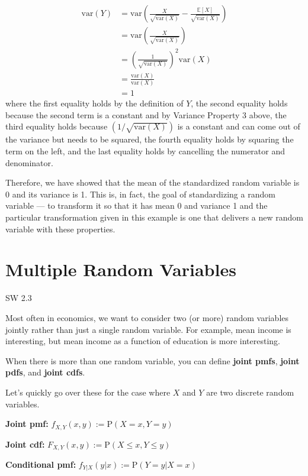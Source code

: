 \documentclass[
  letterpaper,
  DIV=11,
  numbers=noendperiod]{scrreprt}
\begin{document}
\[
  \begin{aligned}
  \mathrm{var}(Y) &= \mathrm{var}\left( \frac{X}{\sqrt{\mathrm{var}(X)}} - \frac{\mathbb{E}[X]}{\sqrt{\mathrm{var}(X)}} \right) \\
  &= \mathrm{var}\left( \frac{X}{\sqrt{\mathrm{var}(X)}}\right) \\
  &= \left( \frac{1}{\sqrt{\mathrm{var}(X)}} \right)^2 \mathrm{var}(X) \\
  &= \frac{\mathrm{var}(X)}{\mathrm{var}(X)} \\
  &= 1
  \end{aligned}
\] where the first equality holds by the definition of \(Y\), the second
equality holds because the second term is a constant and by Variance
Property 3 above, the third equality holds because
\((1/\sqrt{\mathrm{var}(X)})\) is a constant and can come out of the
variance but needs to be squared, the fourth equality holds by squaring
the term on the left, and the last equality holds by cancelling the
numerator and denominator.

Therefore, we have showed that the mean of the standardized random
variable is 0 and its variance is 1. This is, in fact, the goal of
standardizing a random variable --- to transform it so that it has mean
0 and variance 1 and the particular transformation given in this example
is one that delivers a new random variable with these properties.

\section{Multiple Random Variables}\label{multiple-random-variables}

SW 2.3

Most often in economics, we want to consider two (or more) random
variables jointly rather than just a single random variable. For
example, mean income is interesting, but mean income as a function of
education is more interesting.

When there is more than one random variable, you can define
\textbf{joint pmfs}, \textbf{joint pdfs}, and \textbf{joint cdfs}.

Let's quickly go over these for the case where \(X\) and \(Y\) are two
discrete random variables.

\textbf{Joint pmf:} \(f_{X,Y}(x,y) := \mathrm{P}(X=x, Y=y)\)

\textbf{Joint cdf:} \(F_{X,Y}(x,y) := \mathrm{P}(X \leq x, Y \leq y)\)

\textbf{Conditional pmf:} \(f_{Y|X}(y|x) := \mathrm{P}(Y=y | X=x)\)
\end{document}
